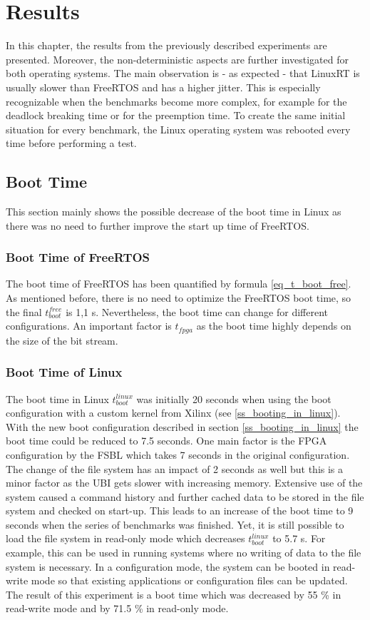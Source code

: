 \chapter{Results}\label{ch_results}
In this chapter, the results from the previously described experiments are presented.
Moreover, the non-deterministic aspects are further investigated for both operating systems. 
The main observation is - as expected - that LinuxRT is usually slower than FreeRTOS and has a higher jitter. 
This is especially recognizable when the benchmarks become more complex, for example for the deadlock breaking time or for the preemption time.
To create the same initial situation for every benchmark, the Linux operating system was rebooted every time before performing a test.

\section{Boot Time}
This section mainly shows the possible decrease of the boot time in Linux as there was no need to further improve the start up time of FreeRTOS.

\subsection{Boot Time of FreeRTOS}
The boot time of FreeRTOS has been quantified by formula \ref{eq_t_boot_free}.
As mentioned before, there is no need to optimize the FreeRTOS boot time, so the final $ t_{boot}^{free} $ is 1,1 s.
Nevertheless, the boot time can change for different configurations.
An important factor is $t_{fpga}$ as the boot time highly depends on the size of the bit stream.

\subsection{Boot Time of Linux}
The boot time in Linux $ t_{boot}^{linux} $ was initially 20 seconds when using the boot configuration with a custom kernel from Xilinx (see \ref{ss_booting_in_linux}). 
With the new boot configuration described in section \ref{ss_booting_in_linux} the boot time could be reduced to 7.5 seconds. 
One main factor is the \ac{FPGA} configuration by the \ac{FSBL} which takes 7 seconds in the original configuration.
The change of the file system has an impact of 2 seconds as well but this is a minor factor as the \ac{UBI} gets slower with increasing memory. 
Extensive use of the system caused a command history and further cached data to be stored in the file system and checked on start-up.
This leads to an increase of the boot time to 9 seconds when the series of benchmarks was finished.
Yet, it is still possible to load the file system in read-only mode which decreases $ t_{boot}^{linux} $ to 5.7 s.
For example, this can be used in running systems where no writing of data to the file system is necessary.
In a configuration mode, the system can be booted in read-write mode so that existing applications or configuration files can be updated. 
The result of this experiment is a boot time which was decreased by 55 \% in read-write mode and by 71.5 \% in read-only mode.

